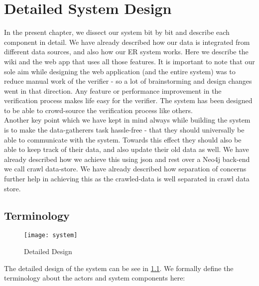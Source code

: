 \chapter{Detailed System Design}

In the present chapter, we dissect our system bit by bit and describe each component in detail. We have already described how our data is integrated from different data sources, and also how our ER system works. Here we describe the wiki and the web app that uses all those features.  It is important to note that our sole aim while designing the web application (and the entire system) was to reduce manual work of the verifier - so a lot of brainstorming and design changes went in that direction. Any feature or performance improvement in the verification process makes life easy for the verifier. The system has been designed to be able to crowd-source the verification process like others. \\

Another key point which we have kept in mind always while building the system is to make the 
data-gatherers task hassle-free  - that they should universally be able to communicate with the system. Towards this effect they should also be able to keep track of their data, and also update their old data as well. We have already described how we achieve this using json and rest over a Neo4j back-end we call crawl data-store. We have already described how separation of concerns  further help in achieving this as the crawled-data is well separated in crawl data store. \\

\section{Terminology}

\begin{figure}[H]
\begin{center}  
\texttt{[image: system]}
\label{fig:system}
\caption{Detailed Design}
\end{center}
\end{figure}

The detailed design of the system can be see in \ref{fig:system}. We formally define the terminology about the actors and system components here:

